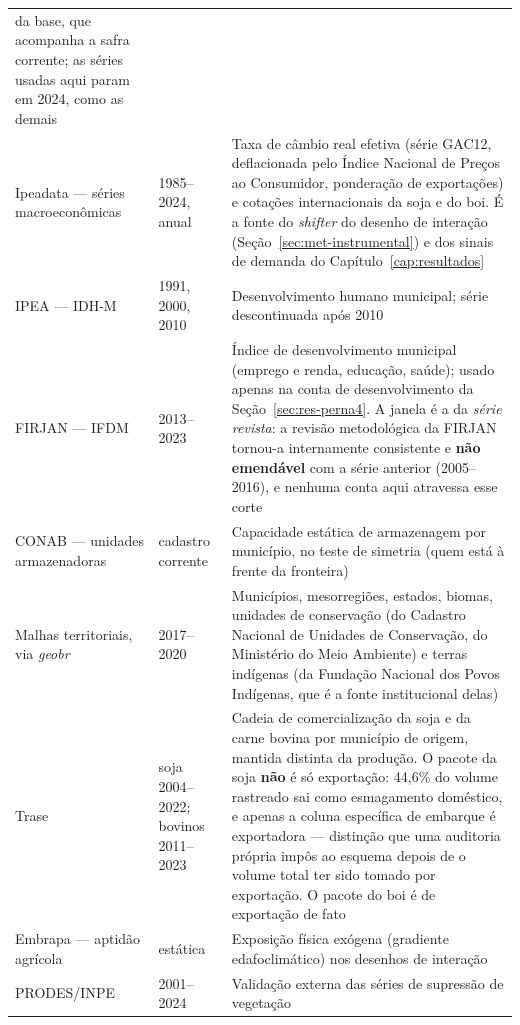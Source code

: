 \begin{quadro}[p]
\begin{tabular}{p{3.6cm}p{2.4cm}p{7.6cm}}
da base, que acompanha a safra corrente; as séries usadas aqui param em 2024,
como as demais \\
\addlinespace
Ipeadata --- séries macroeconômicas & 1985--2024, anual &
Taxa de câmbio real efetiva (série GAC12, deflacionada pelo Índice Nacional de
Preços ao Consumidor, ponderação de exportações) e cotações internacionais da
soja e do boi. É a fonte do \emph{shifter} do desenho de interação
(Seção~\ref{sec:met-instrumental}) e dos sinais de demanda do
Capítulo~\ref{cap:resultados} \\
\addlinespace
IPEA --- IDH-M & 1991, 2000, 2010 &
Desenvolvimento humano municipal; série descontinuada após 2010 \\
\addlinespace
FIRJAN --- IFDM & 2013--2023 &
Índice de desenvolvimento municipal (emprego e renda, educação, saúde);
usado apenas na conta de desenvolvimento da Seção~\ref{sec:res-perna4}. A
janela é a da \emph{série revista}: a revisão metodológica da FIRJAN tornou-a
internamente consistente e \textbf{não emendável} com a série anterior
(2005--2016), e nenhuma conta aqui atravessa esse corte \\
\addlinespace
CONAB --- unidades armazenadoras & cadastro corrente &
Capacidade estática de armazenagem por município, no teste de simetria
(quem está à frente da fronteira) \\
\addlinespace
Malhas territoriais, via \emph{geobr} & 2017--2020 &
Municípios, mesorregiões, estados, biomas, unidades de conservação (do Cadastro
Nacional de Unidades de Conservação, do Ministério do Meio Ambiente) e terras
indígenas (da Fundação Nacional dos Povos Indígenas, que é a fonte
institucional delas) \\
\addlinespace
Trase \cite{Trase2026} & soja 2004--2022; bovinos 2011--2023 &
Cadeia de comercialização da soja e da carne bovina por município de origem,
mantida distinta da produção. O pacote da soja \textbf{não} é só exportação:
44,6\% do volume rastreado sai como esmagamento doméstico, e apenas a coluna
específica de embarque é exportadora --- distinção que uma auditoria própria
impôs ao esquema depois de o volume total ter sido tomado por exportação. O
pacote do boi é de exportação de fato \\
\addlinespace
Embrapa --- aptidão agrícola & estática &
Exposição física exógena (gradiente edafoclimático) nos desenhos de
interação \\
\addlinespace
PRODES/INPE & 2001--2024 &
Validação externa das séries de supressão de vegetação \\
\bottomrule
\end{tabular}
\end{quadro}

